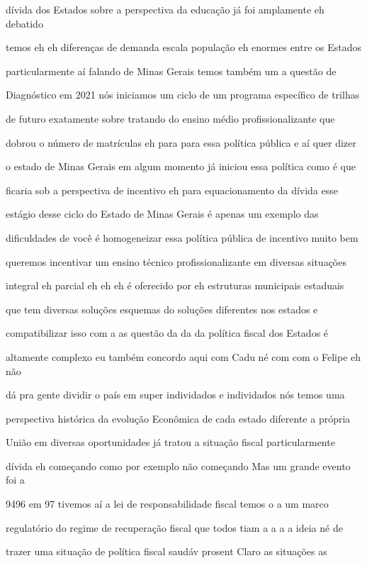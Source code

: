 \documentclass[a4paper,12pt]{article}
\begin{document}
dívida dos Estados sobre a perspectiva da educação já foi amplamente eh debatido

temos eh eh diferenças de demanda escala população eh enormes entre os Estados

particularmente aí falando de Minas Gerais temos também um a questão de

Diagnóstico em 2021 nós iniciamos um ciclo de um programa específico de trilhas

de futuro exatamente sobre tratando do ensino médio profissionalizante que

dobrou o número de matrículas eh para para essa política pública e aí quer dizer

o estado de Minas Gerais em algum momento já iniciou essa política como é que

ficaria sob a perspectiva de incentivo eh para equacionamento da dívida esse

estágio desse ciclo do Estado de Minas Gerais é apenas um exemplo das

dificuldades de você é homogeneizar essa política pública de incentivo muito bem

queremos incentivar um ensino técnico profissionalizante em diversas situações

integral eh parcial eh eh eh é oferecido por eh estruturas municipais estaduais

que tem diversas soluções esquemas do soluções diferentes nos estados e

compatibilizar isso com a as questão da da da política fiscal dos Estados é

altamente complexo eu também concordo aqui com Cadu né com com o Felipe eh não

dá pra gente dividir o país em super individados e individados nós temos uma

perspectiva histórica da evolução Econômica de cada estado diferente a própria

União em diversas oportunidades já tratou a situação fiscal particularmente

dívida eh começando como por exemplo não começando Mas um grande evento foi a

9496 em 97 tivemos aí a lei de responsabilidade fiscal temos o a um marco

regulatório do regime de recuperação fiscal que todos tiam a a a a ideia né de

trazer uma situação de política fiscal saudáv prosent Claro as situações as
\end{document}
